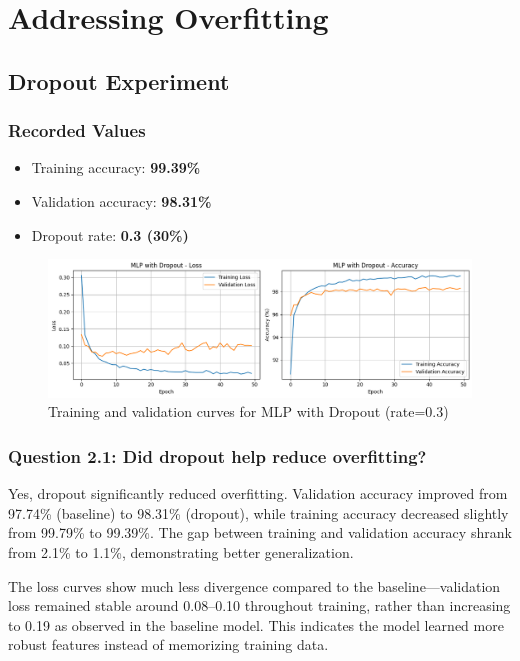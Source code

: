 \section{Addressing Overfitting}

\subsection{Dropout Experiment}

\subsubsection{Recorded Values}
\begin{itemize}
    \item Training accuracy: \textbf{99.39\%}
    \item Validation accuracy: \textbf{98.31\%}
    \item Dropout rate: \textbf{0.3 (30\%)}
\end{itemize}

\begin{figure}[h]
    \centering
    \includegraphics[width=0.8\linewidth]{section2/dropout.png}
    \caption{Training and validation curves for MLP with Dropout (rate=0.3)}
    \label{fig:dropout}
\end{figure}

\subsubsection{Question 2.1: Did dropout help reduce overfitting?}

Yes, dropout significantly reduced overfitting. Validation accuracy improved from 97.74\% (baseline) to 98.31\% (dropout), while training accuracy decreased slightly from 99.79\% to 99.39\%. The gap between training and validation accuracy shrank from 2.1\% to 1.1\%, demonstrating better generalization. 

The loss curves show much less divergence compared to the baseline---validation loss remained stable around 0.08--0.10 throughout training, rather than increasing to 0.19 as observed in the baseline model. This indicates the model learned more robust features instead of memorizing training data.

